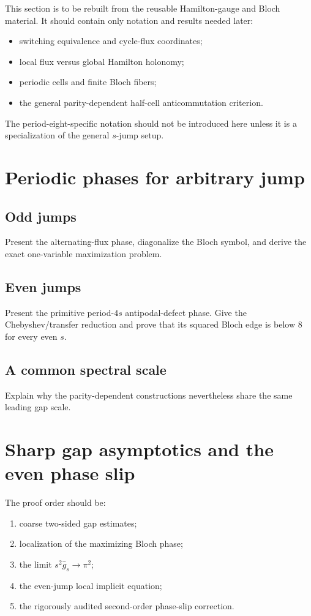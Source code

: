 \documentclass[11pt]{article}
\theoremstyle{remark}
\begin{document}
This section is to be rebuilt from the reusable Hamilton-gauge and Bloch
material.  It should contain only notation and results needed later:

\begin{itemize}
  \item switching equivalence and cycle-flux coordinates;
  \item local flux versus global Hamilton holonomy;
  \item periodic cells and finite Bloch fibers;
  \item the general parity-dependent half-cell anticommutation criterion.
\end{itemize}

The period-eight-specific notation should not be introduced here unless it is
a specialization of the general $s$-jump setup.

\section{Periodic phases for arbitrary jump}

\subsection{Odd jumps}
Present the alternating-flux phase, diagonalize the Bloch symbol, and derive
the exact one-variable maximization problem.

\subsection{Even jumps}
Present the primitive period-$4s$ antipodal-defect phase.  Give the
Chebyshev/transfer reduction and prove that its squared Bloch edge is below
$8$ for every even $s$.

\subsection{A common spectral scale}
Explain why the parity-dependent constructions nevertheless share the same
leading gap scale.

\section{Sharp gap asymptotics and the even phase slip}

The proof order should be:

\begin{enumerate}
  \item coarse two-sided gap estimates;
  \item localization of the maximizing Bloch phase;
  \item the limit $s^2\widehat g_s\to\pi^2$;
  \item the even-jump local implicit equation;
  \item the rigorously audited second-order phase-slip correction.
\end{enumerate}
\end{document}
